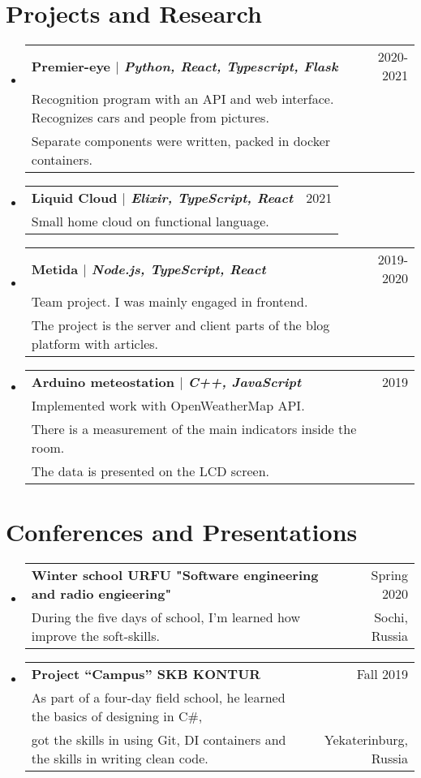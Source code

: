 \documentclass[A4,11pt]{article}
\makeatletter
\newcommand{\CVSubheading}[4]{
  \vspace{-2pt}\item
    \begin{tabular*}{0.97\textwidth}[t]{l@{\extracolsep{\fill}}r}
      \textbf{#1} & #2 \\
      \small#3 & \small #4 \\
    \end{tabular*}\vspace{-7pt}
}
\newcommand{\CVSubHeadingListStart}{\begin{itemize}[leftmargin=0.5cm, label={}]}
\newcommand{\CVSubHeadingListEnd}{\end{itemize}}
\makeatother
\begin{document}
\section{Projects and Research}
  \CVSubHeadingListStart
    \CVSubheading
      {{Premier-eye} $|$ \emph{\small{Python, React, Typescript, Flask}}}{2020-2021}
      {Recognition program with an API and web interface. Recognizes cars and people from pictures. \\
      Separate components were written, packed in docker containers.}{}
    \CVSubheading
      {{Liquid Cloud} $|$ \emph{\small{Elixir, TypeScript, React}}}{2021}
      {Small home cloud on functional language.}{}
    \CVSubheading
      {{Metida} $|$ \emph{\small{Node.js, TypeScript, React}}}{2019-2020}
      {Team project. I was mainly engaged in frontend. \\
      The project is the server and client parts of the blog platform with articles.}{}
    \CVSubheading
      {{Arduino meteostation} $|$ \emph{\small{C++, JavaScript}}}{2019}
      {Implemented work with OpenWeatherMap API. \\
      There is a measurement of the main indicators inside the room. \\
      The data is presented on the LCD screen.}{}
  \CVSubHeadingListEnd


\begin{comment}
Again the title should have already been enough, but if it is necessary to add
descriptions maintain the consistency from prior sections
\end{comment}

\section{Conferences and Presentations}
  \CVSubHeadingListStart
    \CVSubheading
      {Winter school URFU "Software engineering and radio engieering"}{Spring 2020}
      {During the five days of school, I’m learned how improve the soft-skills. }{Sochi, Russia}
    \CVSubheading
      { Project “Campus” SKB KONTUR }{Fall 2019}
      { As part of a four-day field school, he learned the basics of designing in C\#, \\
      got the skills in using Git, DI containers and the skills in writing clean code. }{ Yekaterinburg, Russia }
  \CVSubHeadingListEnd
\end{document}
